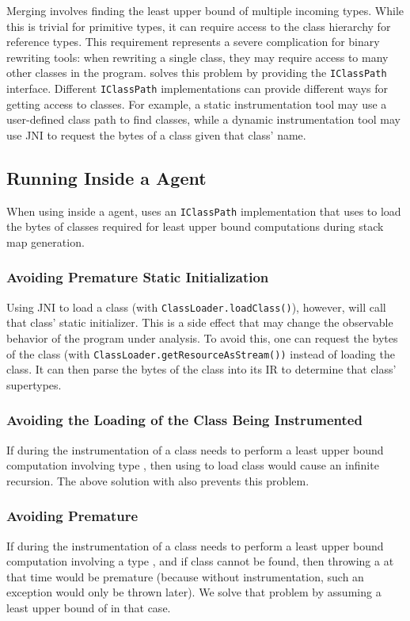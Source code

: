 Merging involves finding the least upper bound of multiple incoming types.
While this is trivial for primitive types,
it can require access to the class hierarchy for reference types.
This requirement represents a severe complication for binary rewriting tools:
when rewriting a single class, they may require access to many other classes in the program.
\jnif{} solves this problem by providing the \texttt{IClassPath} interface.
Different \texttt{IClassPath} implementations can provide different ways for getting access to classes.
For example, a static instrumentation tool may use a user-defined class path to find classes,
while a dynamic instrumentation tool may use JNI to request the bytes of a class given that class' name.

\subsection*{Running \jnif{} Inside a \jvmti{} Agent}
When using \jnif{} inside a \jvmti{} agent, 
\jnif{} uses an \texttt{IClassPath} implementation
that uses \jni{} to load the bytes of classes
required for least upper bound computations during stack map generation.

\subsubsection*{Avoiding Premature Static Initialization}
Using JNI to load a class (with \texttt{ClassLoader.loadClass()}), however, will call that class' static initializer.
This is a side effect that may change the observable behavior of the program under analysis.
To avoid this, one can request the bytes of the class (with \texttt{ClassLoader.getResourceAsStream())} instead of loading the class.
It can then parse the bytes of the class into its IR to determine that class' supertypes.

\subsubsection*{Avoiding the Loading of the Class Being Instrumented}
If during the instrumentation of a class  \jnif{} needs to
perform a least upper bound computation involving type ,
then using  to load class  would
cause an infinite recursion.
The above solution with  also prevents this problem.


\subsubsection*{Avoiding Premature }

If during the instrumentation of a class 
\jnif{} needs to perform a least upper bound computation involving a type ,
and if class  cannot be found,
then throwing a  at that time would be premature
(because without instrumentation,
such an exception would only be thrown later).
We solve that problem by assuming a least upper bound of  in that case.

